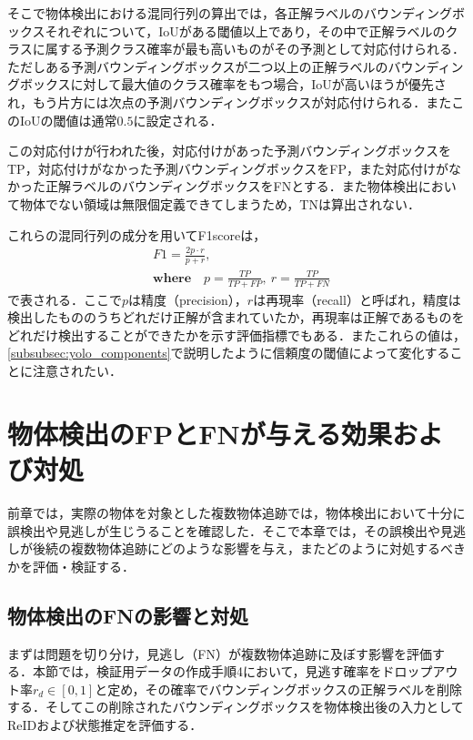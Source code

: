     そこで物体検出における混同行列の算出では，各正解ラベルのバウンディングボックスそれぞれについて，IoUがある閾値以上であり，その中で正解ラベルのクラスに属する予測クラス確率が最も高いものがその予測として対応付けられる．ただしある予測バウンディングボックスが二つ以上の正解ラベルのバウンディングボックスに対して最大値のクラス確率をもつ場合，IoUが高いほうが優先され，もう片方には次点の予測バウンディングボックスが対応付けられる．またこのIoUの閾値は通常$0.5$に設定される．

    この対応付けが行われた後，対応付けがあった予測バウンディングボックスをTP，対応付けがなかった予測バウンディングボックスをFP，また対応付けがなかった正解ラベルのバウンディングボックスをFNとする．また物体検出において物体でない領域は無限個定義できてしまうため，TNは算出されない．

    これらの混同行列の成分を用いてF1scoreは，
    \begin{equation}
        \label{eq:f1_score}
        \begin{aligned}
            &F1 = \frac{2 p\cdot r}{p + r},
            \\ &\textbf{where} \quad p = \frac{TP}{TP + FP}, ~ r = \frac{TP}{TP + FN}
        \end{aligned}
    \end{equation}
    で表される．ここで$p$は精度（precision），$r$は再現率（recall）と呼ばれ，精度は検出したもののうちどれだけ正解が含まれていたか，再現率は正解であるものをどれだけ検出することができたかを示す評価指標でもある．またこれらの値は，\ref{subsubsec:yolo_components}で説明したように信頼度の閾値によって変化することに注意されたい．

\section{物体検出のFPとFNが与える効果および対処}
\label{sec:covering_detection}

    前章では，実際の物体を対象とした複数物体追跡では，物体検出において十分に誤検出や見逃しが生じうることを確認した．そこで本章では，その誤検出や見逃しが後続の複数物体追跡にどのような影響を与え，またどのように対処するべきかを評価・検証する．

    \subsection{物体検出のFNの影響と対処}
    \label{subsec:false_negative_effect}

    まずは問題を切り分け，見逃し（FN）が複数物体追跡に及ぼす影響を評価する．本節では，検証用データの作成手順4において，見逃す確率をドロップアウト率$r_{d} \in [0, 1]$と定め，その確率でバウンディングボックスの正解ラベルを削除する．そしてこの削除されたバウンディングボックスを物体検出後の入力としてReIDおよび状態推定を評価する．

